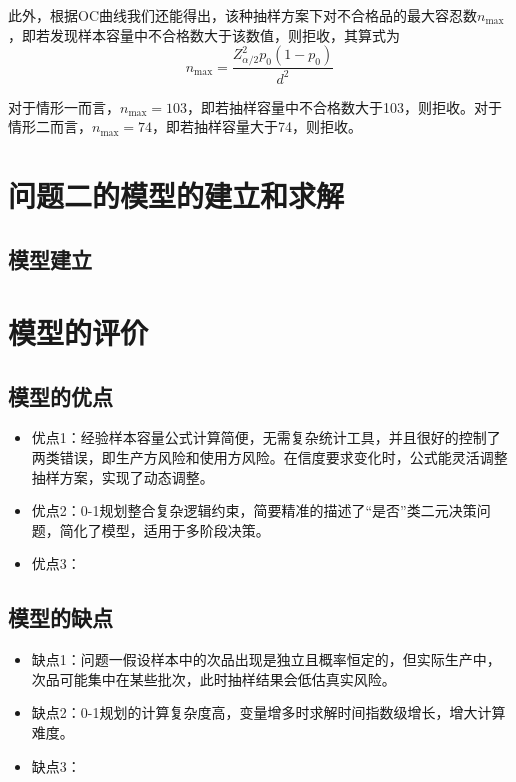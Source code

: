 \documentclass[withoutpreface,bwprint]{cumcmthesis}
\begin{document}
此外，根据OC曲线我们还能得出，该种抽样方案下对不合格品的最大容忍数$n_{\text{max}}$，即若发现样本容量中不合格数大于该数值，则拒收，其算式为
\begin{equation}
   n_{\text{max}}=\frac{Z_{\alpha/2}^2p_0(1-p_0)}{d^2}
\end{equation}

对于情形一而言，$n_{\text{max}}=103$，即若抽样容量中不合格数大于103，则拒收。对于情形二而言，$n_{\text{max}}=74$，即若抽样容量大于74，则拒收。

\section{问题二的模型的建立和求解}
\subsection{模型建立}





\section{模型的评价}

\subsection{模型的优点}
\begin{itemize}[itemindent=2em]
\item 优点1：经验样本容量公式计算简便，无需复杂统计工具，并且很好的控制了两类错误，即生产方风险和使用方风险。在信度要求变化时，公式能灵活调整抽样方案，实现了动态调整。

\item 优点2：0-1规划整合复杂逻辑约束，简要精准的描述了“是否”类二元决策问题，简化了模型，适用于多阶段决策。

\item 优点3：

\end{itemize}

\subsection{模型的缺点}
\begin{itemize}[itemindent=2em]
\item 缺点1：问题一假设样本中的次品出现是独立且概率恒定的，但实际生产中，次品可能集中在某些批次，此时抽样结果会低估真实风险。

\item 缺点2：0-1规划的计算复杂度高，变量增多时求解时间指数级增长，增大计算难度。

\item 缺点3：
\end{itemize}
\end{document}
